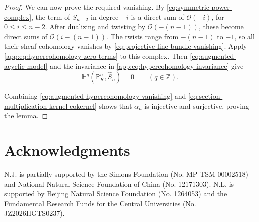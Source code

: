 \documentclass[12pt,reqno,a4paper]{amsart}
\numberwithin{equation}{section}
\numberwithin{figure}{section}
\theoremstyle{plain}
\theoremstyle{definition}
\begin{document}
\begin{proof}
We can now prove the required vanishing.
By \eqref{eq:symmetric-power-complex}, the term of
$S_{n-2}$ in degree $-i$ is a direct sum of $\mathcal O(-i)$,
for $0\leq i\leq n-2$.
After dualizing and twisting by $\mathcal O(-(n-1))$, these become
direct sums of $\mathcal O(i-(n-1))$.
The twists range from $-(n-1)$ to $-1$, so all their sheaf cohomology
vanishes by \eqref{eq:projective-line-bundle-vanishing}.
Apply \eqref{app:eq:hypercohomology-zero-terms} to this complex.
Then \eqref{eq:augmented-acyclic-model} and the invariance in
\eqref{app:eq:hypercohomology-invariance} give
\begin{equation}\label{eq:augmented-hypercohomology-vanishing}
 \mathbb H^q(\mathbb P^n_K,\widehat S_n)=0
       \qquad(q\in\mathbb Z).
\end{equation}

Combining \eqref{eq:augmented-hypercohomology-vanishing} and
\eqref{eq:section-multiplication-kernel-cokernel} shows that
$\alpha_n$ is injective and surjective, proving the lemma.
\end{proof}


\section*{Acknowledgments}
N.J. is partially supported by the Simons Foundation
(No. MP-TSM-00002518) and National Natural Science Foundation of China
(No. 12171303).  N.L. is supported by Beijing Natural Science Foundation (No. 1264053) and the Fundamental Research Funds for the Central Universities (No. JZ2026HGTS0237).
\end{document}
